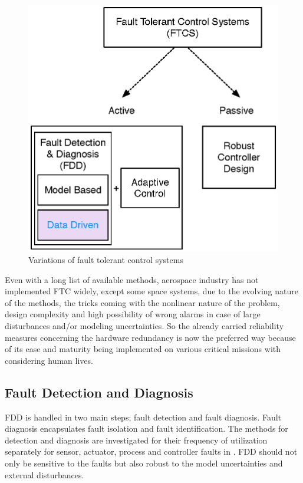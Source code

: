 \begin{figure}
\begin{center}
\includegraphics[width=11.3cm]{figures/FTCS}
\caption{Variations of fault tolerant control systems } 
\label{fig:FTCS}
\end{center}
\end{figure}


Even with a long list of available methods, aerospace industry has not implemented 
FTC widely, except some space systems, due to the evolving nature of the methods, 
the tricks coming with the nonlinear nature of the problem, design complexity and high 
possibility of wrong alarms in case of large disturbances and/or modeling uncertainties. 
So the already carried reliability measures concerning the hardware redundancy is 
now the preferred way because of its ease and maturity being implemented on various 
critical missions with considering human lives.

\subsection{Fault Detection and Diagnosis}

FDD is handled in two main steps; fault detection and fault diagnosis. Fault diagnosis 
encapsulates fault isolation and fault identification. The methods for detection and 
diagnosis are investigated for their frequency of utilization separately for sensor, 
actuator, process and controller faults in \cite{isermann1997trends}. FDD should 
not only be sensitive to the faults but also robust to the model uncertainties and 
external disturbances.


